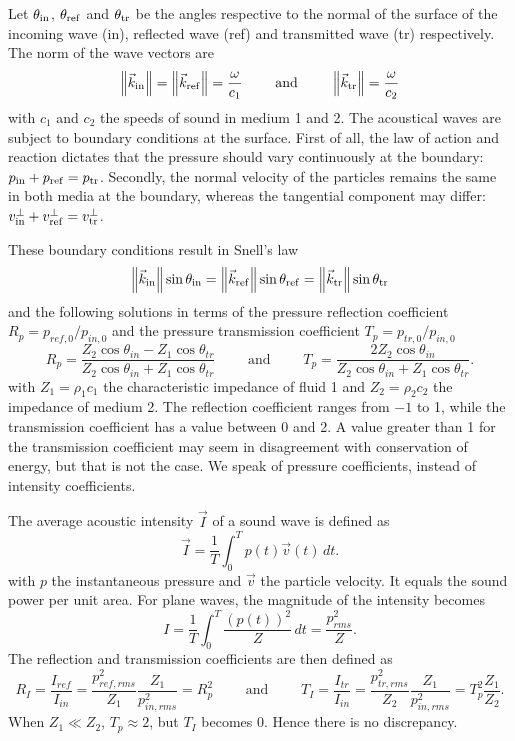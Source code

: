 Let $\theta_\mathrm{in}$, $\theta_\mathrm{ref}$ and $\theta_\mathrm{tr}$ be the angles respective to the normal of the surface of the incoming wave (in), reflected  wave (ref) and transmitted  wave (tr) respectively. The norm of the wave vectors are 
\[
\left\|\vec{k}_\mathrm{in}\right\|
= \left\|\vec{k}_\mathrm{ref}\right\|
= \frac{\omega}{c_1}
\qquad\textrm{ and } \qquad
\left\|\vec{k}_\mathrm{tr}\right\|
= \frac{\omega}{c_2}
\]
with $c_1$ and $c_2$ the speeds of sound in medium 1 and 2. The acoustical waves are subject to boundary conditions at the surface. First of all, the law of action and reaction dictates that the pressure should vary continuously at the boundary: $p_\mathrm{in} + p_\mathrm{ref} = p_\mathrm{tr}$.
Secondly, the normal velocity of the particles remains the same in both media at the boundary, whereas the tangential component may differ: $v_\mathrm{in}^\perp + v_\mathrm{ref}^\perp = v_\mathrm{tr}^\perp$.

These boundary conditions result in Snell's law
\[
\left\|\vec{k}_\mathrm{in}\right\| \sin\theta_\mathrm{in} = \left\|\vec{k}_\mathrm{ref}\right\| \sin\theta_\mathrm{ref} = \left\|\vec{k}_\mathrm{tr}\right\| \sin\theta_\mathrm{tr}
\]
and the following solutions in terms of the pressure reflection coefficient $R_p = p_{ref,0}/p_{in,0}$ and the pressure transmission coefficient $T_p = p_{tr,0}/p_{in,0}$ 
\[
R_p = \frac{Z_2 \cos \theta_{in} - Z_1 \cos \theta_{tr}}{Z_2 \cos \theta_{in} + Z_1 \cos \theta_{tr}} \qquad \textrm{ and } \qquad
T_p = \frac{2 Z_2 \cos \theta_{in} }{Z_2 \cos \theta_{in} + Z_1 \cos \theta_{tr}}.
\]
with $Z_1 = \rho_1 c_1$ the characteristic impedance of fluid 1 and $Z_2 = \rho_2 c_2$ the impedance of medium 2.  
The reflection coefficient ranges from $-1$ to 1, while the transmission coefficient has a value between 0 and 2. A value greater than 1 for the transmission coefficient may seem in disagreement with conservation of energy, but that is not the case. We speak of pressure coefficients, instead of intensity coefficients. 

The average acoustic intensity $\vec{I}$ of a sound wave is defined as 
\[
\vec{I} = \frac{1}{T} \int^{T}_{0}{p(t) \vec{v}(t) \,dt}.
\]
with $p$ the instantaneous pressure and $\vec{v}$ the particle velocity. It equals the sound power per unit area. For plane waves, the magnitude of the intensity becomes 
\[
I = \frac{1}{T} \int^{T}_{0}{\frac{\left(p(t)\right)^2}{Z} \,dt} = \frac{p^2_{rms}}{Z}.
\]
The reflection and transmission coefficients are then defined as
\[
R_I = \frac{I_{ref}}{I_{in}} = \frac{p^2_{ref,rms}}{Z_1} \frac{Z_1}{p^2_{in,rms}} = R_p^2 \qquad\textrm{ and } \qquad T_I = \frac{I_{tr}}{I_{in}} = \frac{p^2_{tr,rms}}{Z_2} \frac{Z_1}{p^2_{in,rms}} = T_p^2 \frac{Z_1}{Z_2}. 
\]
When $Z_1 \ll Z_2$, $T_p \approx 2$, but $T_I$ becomes 0. Hence there is no discrepancy.




